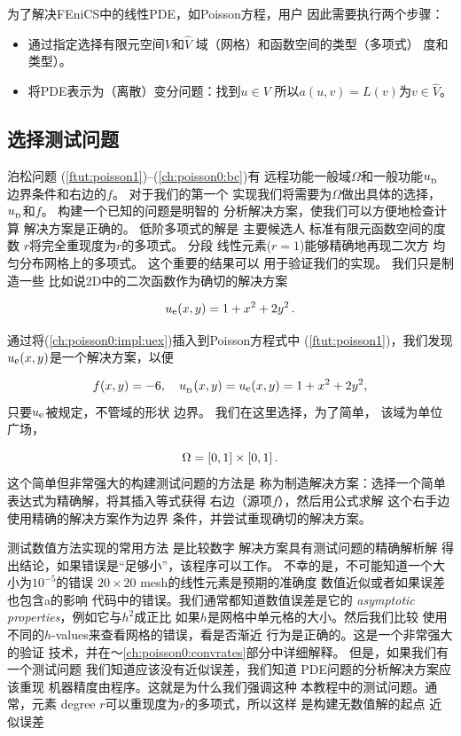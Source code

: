 为了解决FEniCS中的线性PDE，如Poisson方程，用户
因此需要执行两个步骤：

\begin{itemize}
\item 通过指定选择有限元空间$V$和$\hat V$
域（网格）和函数空间的类型（多项式）
度和类型）。
\item 将PDE表示为（离散）变分问题：找到$u\in V$
所以$a(u,v) = L(v)$为$v\in \hat{V}$。
\end{itemize}

\noindent
\subsection{选择测试问题}
\label{ch:poisson0:testproblem}

泊松问题 (\ref{ftut:poisson1})--(\ref{ch:poisson0:bc})有
远程功能一般域$\Omega$和一般功能$\ub$
边界条件和右边的$f$。 对于我们的第一个
实现我们将需要为$\Omega$做出具体的选择，
$\ub$和$f$。 构建一个已知的问题是明智的
分析解决方案，使我们可以方便地检查计算
解决方案是正确的。 低阶多项式的解是
主要候选人 标准有限元函数空间的度数
$r$将完全重现度为$r$的多项式。 分段
线性元素($r = 1$)能够精确地再现二次方
均匀分布网格上的多项式。 这个重要的结果可以
用于验证我们的实现。 我们只是制造一些
比如说2D中的二次函数作为确切的解决方案


\begin{equation}
\label{ch:poisson0:impl:uex}
\uex(x,y) = 1 +x^2 + 2y^2\tp
\end{equation}

通过将(\ref{ch:poisson0:impl:uex})插入到Poisson方程式中
(\ref{ftut:poisson1})，我们发现$\uex(x,y)$是一个解决方案，以便

\[ f(x,y) = -6,\quad \ub(x,y)=\uex(x,y)=1 + x^2 + 2y^2,\]
只要$\uex$被规定，不管域的形状
边界。 我们在这里选择，为了简单，
该域为单位广场，

\[ \Omega = [0,1]\times [0,1] \tp\]
这个简单但非常强大的构建测试问题的方法是
称为制造解决方案：选择一个简单
表达式为精确解，将其插入等式获得
右边（源项$f$），然后用公式求解
这个右手边使用精确的解决方案作为边界
条件，并尝试重现确切的解决方案。


\begin{notice}[提示:尝试使用精确的数值解决方案验证您的代码!]
测试数值方法实现的常用方法
是比较数字
解决方案具有测试问题的精确解析解
得出结论，如果错误是“足够小”，该程序可以工作。
不幸的是，不可能知道一个大小为$10^{ - 5}$的错误
$20\times 20$ mesh的线性元素是预期的准确度
数值近似或者如果误差也包含a的影响
代码中的错误。我们通常都知道数值误差是它的
\emph{asymptotic properties}，例如它与$h^2$成正比
如果$h$是网格中单元格的大小。然后我们比较
使用不同的$h$-values来查看网格的错误，看是否渐近
行为是正确的。这是一个非常强大的验证
技术，并在〜\ref{ch:poisson0:convrates}部分中详细解释。
但是，如果我们有一个测试问题
我们知道应该没有近似误差，我们知道
PDE问题的分析解决方案应该重现
机器精度由程序。这就是为什么我们强调这种
本教程中的测试问题。通常，元素
degree $r$可以重现度为$r$的多项式，所以这样
是构建无数值解的起点
近似误差
\end{notice}

